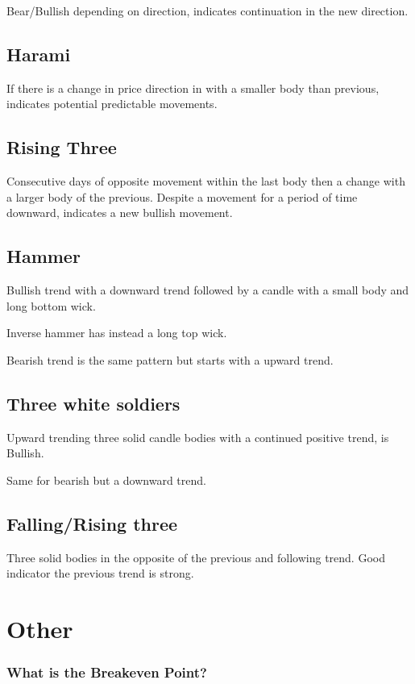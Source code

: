 \documentclass[11pt]{scrartcl} %
\begin{document}
Bear/Bullish depending on direction, indicates continuation in the new direction.

\subsection{Harami}

If there is a change in price direction in with a smaller body than previous, indicates potential 
predictable movements.

\subsection{Rising Three}

Consecutive days of opposite movement within the last body then a change with a larger body of the 
previous. Despite a movement for a period of time downward, indicates a new bullish movement.

\subsection{Hammer}

Bullish trend with a downward trend followed by a candle with a small body and long bottom wick.

Inverse hammer has instead a long top wick.

Bearish trend is the same pattern but starts with a upward trend.

\subsection{Three white soldiers}

Upward trending three solid candle bodies with a continued positive trend, is Bullish.

Same for bearish but a downward trend.

\subsection{Falling/Rising three}

Three solid bodies in the opposite of the previous and following trend. Good indicator the previous
trend is strong.

\section{Other}

\subsubsection{What is the Breakeven Point?}
\end{document}
